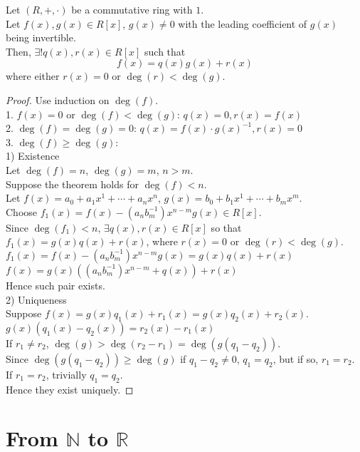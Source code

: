 \documentclass{report}
\begin{document}
		\begin{thm} \label{thm_polynomial_division_algorithm_ring}
			Let $(R,+,\cdot)$ be a commutative ring with $1$.\\
			Let $f(x),g(x) \in R[x]$, $g(x) \ne 0$ with the leading coefficient of $g(x)$ being invertible.\\
			Then, $\exists! q(x),r(x) \in R[x]$ such that
			\begin{displaymath}
				f(x)=q(x)g(x)+r(x)
			\end{displaymath}
			where either $r(x)=0$ or $\deg(r)<\deg(g)$.
		\end{thm}
		\begin{proof}
				Use induction on $\deg(f)$.\\
				1. $f(x)=0$ or $\deg(f)<\deg(g)$: $q(x)=0, r(x)=f(x)$\\
				2. $\deg(f)=\deg(g)=0$: $q(x)=f(x) \cdot g(x)^{-1}, r(x)=0$\\
				3. $\deg(f)\ge\deg(g)$:\\
				
				1) Existence\\
				Let $\deg(f)=n$, $\deg(g)=m$, $n>m$.\\
				Suppose the theorem holds for $\deg(f)<n$.\\
				Let $f(x)=a_0+a_1x^1+\cdots+a_nx^n$, $g(x)=b_0+b_1x^1+\cdots+b_mx^m$.\\
				Choose $f_1(x)=f(x)-(a_nb_m^{-1})x^{n-m}g(x)\in R[x]$.\\
				Since $\deg(f_1)<n$, $\exists q(x),r(x)\in R[x]$ so that $f_1(x)=g(x)q(x)+r(x)$, where $r(x)=0$ or $\deg(r)<\deg(g)$.\\
				$f_1(x)=f(x)-(a_nb_m^{-1})x^{n-m}g(x)=g(x)q(x)+r(x)$\\
				$f(x)=g(x)((a_nb_m^{-1})x^{n-m}+q(x))+r(x)$\\
				Hence such pair exists.\\
				
				2) Uniqueness\\
				Suppose $f(x)=g(x)q_1(x)+r_1(x)=g(x)q_2(x)+r_2(x)$.\\
				$g(x)(q_1(x)-q_2(x))=r_2(x)-r_1(x)$\\
				If $r_1 \ne r_2$, $\deg(g)>\deg(r_2-r_1)=\deg(g(q_1-q_2))$.\\
				Since $\deg(g(q_1-q_2))\ge\deg(g)$ if $q_1-q_2\ne0$, $q_1=q_2$, but if so, $r_1=r_2$.\\
				If $r_1=r_2$, trivially $q_1=q_2$.\\
				Hence they exist uniquely.
		\end{proof}
	\section{From $\mathbb{N}$ to $\mathbb{R}$}
\end{document}
